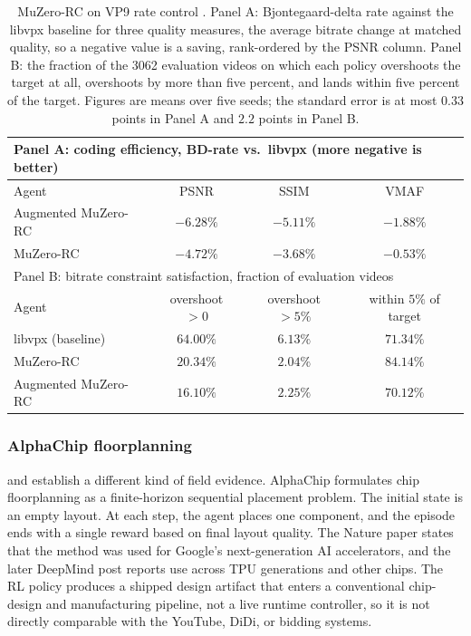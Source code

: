 \begin{table}[t]
\centering
\small
\begin{tabular}{lccc}
\toprule
\multicolumn{4}{l}{Panel A: coding efficiency, BD-rate vs.\ libvpx (more negative is better)} \\
\midrule
Agent & PSNR & SSIM & VMAF \\
\midrule
Augmented MuZero-RC & $-6.28\%$ & $-5.11\%$ & $-1.88\%$ \\
MuZero-RC & $-4.72\%$ & $-3.68\%$ & $-0.53\%$ \\
\midrule
\multicolumn{4}{l}{Panel B: bitrate constraint satisfaction, fraction of evaluation videos} \\
\midrule
Agent & overshoot ${>}0$ & overshoot ${>}5\%$ & within $5\%$ of target \\
\midrule
libvpx (baseline) & $64.00\%$ & $6.13\%$ & $71.34\%$ \\
MuZero-RC & $20.34\%$ & $2.04\%$ & $84.14\%$ \\
Augmented MuZero-RC & $16.10\%$ & $2.25\%$ & $70.12\%$ \\
\bottomrule
\end{tabular}
\caption{MuZero-RC on VP9 rate control \citep{Mandhane2022MuZeroRC}. Panel A: Bjontegaard-delta rate against the libvpx baseline for three quality measures, the average bitrate change at matched quality, so a negative value is a saving, rank-ordered by the PSNR column. Panel B: the fraction of the 3062 evaluation videos on which each policy overshoots the target at all, overshoots by more than five percent, and lands within five percent of the target. Figures are means over five seeds; the standard error is at most $0.33$ points in Panel A and $2.2$ points in Panel B.}
\label{tab:muzero_results}
\end{table}

\subsubsection{AlphaChip floorplanning}
\citet{Mirhoseini2021GraphPlacement} and \citet{GoldieMirhoseini2024AlphaChipPost} establish a different kind of field evidence. AlphaChip formulates chip floorplanning as a finite-horizon sequential placement problem. The initial state is an empty layout. At each step, the agent places one component, and the episode ends with a single reward based on final layout quality. The Nature paper states that the method was used for Google's next-generation AI accelerators, and the later DeepMind post reports use across TPU generations and other chips. The RL policy produces a shipped design artifact that enters a conventional chip-design and manufacturing pipeline, not a live runtime controller, so it is not directly comparable with the YouTube, DiDi, or bidding systems.

